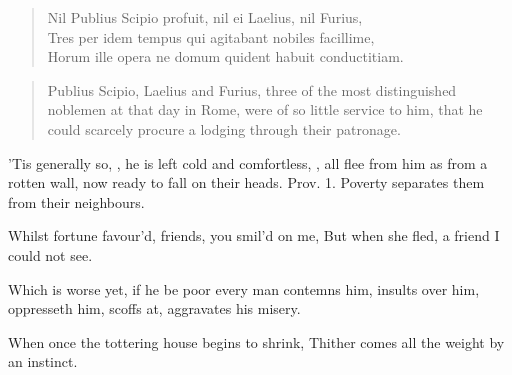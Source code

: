 {\begin{latin}
\begin{quote}
Nil Publius Scipio profuit, nil ei Laelius, nil Furius,\\
Tres per idem tempus qui agitabant nobiles facillime,\\
Horum ille opera ne domum quident habuit conductitiam.
\end{quote}
\end{latin}
\translationrule
\begin{quote}%
Publius Scipio, Laelius and Furius, three of the most distinguished noblemen at that day in Rome, were of so little service to him, that he could scarcely procure a lodging through their patronage.
\end{quote}
%
'Tis generally so, , he is left
cold and comfortless, , all flee from
him as from a rotten wall, now ready to fall on their heads. Prov. 
1. Poverty separates them from their neighbours.

Whilst fortune favour'd, friends, you smil'd on me,
But when she fled, a friend I could not see.

Which is worse yet, if he be poor every man contemns him, insults
over him, oppresseth him, scoffs at, aggravates his misery.

When once the tottering house begins to shrink,
Thither comes all the weight by an instinct.

}
